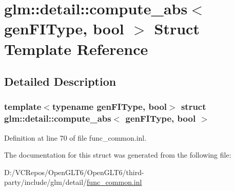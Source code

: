 \hypertarget{structglm_1_1detail_1_1compute__abs}{}\section{glm\+::detail\+::compute\+\_\+abs$<$ gen\+F\+I\+Type, bool $>$ Struct Template Reference}
\label{structglm_1_1detail_1_1compute__abs}


\subsection{Detailed Description}
\subsubsection*{template$<$typename gen\+F\+I\+Type, bool$>$\newline
struct glm\+::detail\+::compute\+\_\+abs$<$ gen\+F\+I\+Type, bool $>$}



Definition at line 70 of file func\+\_\+common.\+inl.



The documentation for this struct was generated from the following file\+:\begin{DoxyCompactItemize}
\item 
D\+:/\+V\+C\+Repos/\+Open\+G\+L\+T6/\+Open\+G\+L\+T6/third-\/party/include/glm/detail/\mbox{\hyperlink{func__common_8inl}{func\+\_\+common.\+inl}}\end{DoxyCompactItemize}
